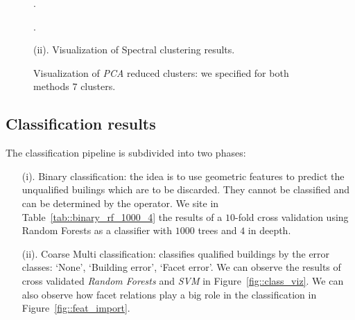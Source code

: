\documentclass[../main.tex]{subfile}
\begin{document}
\begin{figure}[H]
{{\begin{subfloatrow}[2]
                    {
                        \caption{.}\label{fig::spectral_1}
                    }
                    {
                        \caption{.}\label{fig::spectral_2}
                    }
                \end{subfloatrow}
            }
            {
                \caption*{(ii). Visualization of Spectral clustering results.}
            }
        }
        {
            \caption{\label{fig::clust_viz} Visualization of \textit{PCA} reduced clusters: we specified for both methods $7$ clusters.}
        }
    \end{figure}

    \subsection{Classification results}

    The classification pipeline is subdivided into two phases:

    \begin{itemize}
        \item[(i).] Binary classification: the idea is to use geometric features to predict the unqualified builings which are to be discarded. They cannot be classified and can be determined by the operator. We site in Table~\ref{tab::binary_rf_1000_4} the results of a $10$-fold cross validation using Random Forests as a classifier with $1000$ trees and $4$ in deepth.

        \item[(ii).] Coarse Multi classification: classifies qualified buildings by the error classes: `None', `Building error', `Facet error'. We can observe the results of cross validated \textit{Random Forests} and \textit{SVM} in Figure~\ref{fig::class_viz}. We can also observe how facet relations play a big role in the classification in Figure~\ref{fig::feat_import}.
    \end{itemize}
\end{document}
